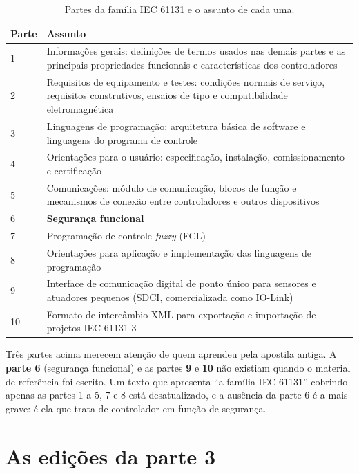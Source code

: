 \begin{table}[H]
  \centering
  \caption{Partes da família IEC 61131 e o assunto de cada uma.}
  \label{tab:partes-iec61131}
  \begin{tabular}{p{1.6cm} p{13.0cm}}
    \toprule
    Parte & Assunto \\
    \midrule
    1 & Informações gerais: definições de termos usados nas demais partes e as principais
        propriedades funcionais e características dos controladores \\
    2 & Requisitos de equipamento e testes: condições normais de serviço, requisitos construtivos,
        ensaios de tipo e compatibilidade eletromagnética \\
    3 & Linguagens de programação: arquitetura básica de software e linguagens do programa de
        controle \\
    4 & Orientações para o usuário: especificação, instalação, comissionamento e certificação \\
    5 & Comunicações: módulo de comunicação, blocos de função e mecanismos de conexão entre
        controladores e outros dispositivos \\
    6 & \textbf{Segurança funcional} \\
    7 & Programação de controle \emph{fuzzy} (FCL) \\
    8 & Orientações para aplicação e implementação das linguagens de programação \\
    9 & Interface de comunicação digital de ponto único para sensores e atuadores pequenos (SDCI,
        comercializada como IO-Link) \\
    10 & Formato de intercâmbio XML para exportação e importação de projetos IEC 61131-3 \\
    \bottomrule
  \end{tabular}
\end{table}

\begin{atencao}
Três partes acima merecem atenção de quem aprendeu pela apostila antiga. A \textbf{parte 6}
(segurança funcional) e as partes \textbf{9} e \textbf{10} não existiam quando o material de
referência foi escrito. Um texto que apresenta ``a família IEC 61131'' cobrindo apenas as partes 1 a
5, 7 e 8 está desatualizado, e a ausência da parte 6 é a mais grave: é ela que trata de controlador
em função de segurança.
\end{atencao}

\section{As edições da parte 3}

